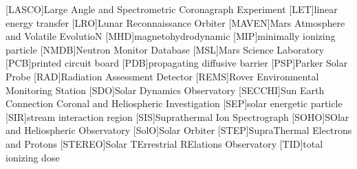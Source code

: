 \begin{acronym}
    [LASCO]{Large Angle and Spectrometric Coronagraph Experiment}
	[LET]{linear energy transfer}
	[LRO]{Lunar Reconnaissance Orbiter}
	[MAVEN]{Mars Atmosphere and Volatile EvolutioN}
	[MHD]{magnetohydrodynamic}
	[MIP]{minimally ionizing particle}
	[NMDB]{Neutron Monitor Database}
	[MSL]{Mars Science Laboratory}
	[PCB]{printed circuit board}
	[PDB]{propagating diffusive barrier}
	[PSP]{Parker Solar Probe}
	[RAD]{Radiation Assessment Detector}
	[REMS]{Rover Environmental Monitoring Station}
	[SDO]{Solar Dynamics Observatory}
    [SECCHI]{Sun Earth Connection Coronal and Heliospheric Investigation}
	[SEP]{solar energetic particle}
	[SIR]{stream interaction region}
	[SIS]{Suprathermal Ion Spectrograph}
	[SOHO]{SOlar and Heliospheric Observatory}
	[SolO]{Solar Orbiter}
	[STEP]{SupraThermal Electrons and Protons}
	[STEREO]{Solar TErrestrial RElations Observatory}
	[TID]{total ionizing dose}
	\end{acronym}
	

\endgroup

\cleardoublepage
